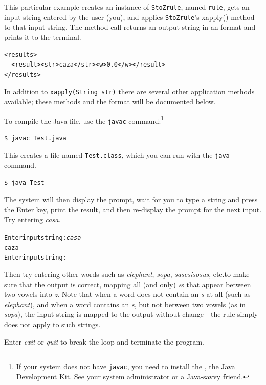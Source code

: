 \noindent
This particular example creates an instance of \texttt{StoZrule}, named \texttt{rule}, gets an input
string entered by the user (you), and applies \texttt{StoZrule}'s xapply() method to that input string.  The method call returns an output string in an \xml{}
format and prints it to the terminal.   

\begin{Verbatim}
<results>
  <result><str>caza</str><w>0.0</w></result>
</results>
\end{Verbatim}

In addition to \texttt{xapply(String str)} there are several other
application methods available; these methods and the \xml{} format
will be documented below.

To compile the Java file, use the \texttt{javac} command:\footnote{If your system does not have
\texttt{javac}, you need to install the , the Java Development Kit.  See your system
administrator or a Java-savvy friend.}

\begin{Verbatim}
$ javac Test.java
\end{Verbatim}

\noindent
This creates a file named \texttt{Test.class}, which you can run with the \texttt{java} command.

\begin{Verbatim}
$ java Test
\end{Verbatim}

\noindent
The system will then display the prompt, wait for you to type a string and press the Enter key,
print the result, and then re-display the prompt for the next input.  Try entering \emph{casa}.

\begin{alltt}
Enter input string: \emph{casa}
caza
Enter input string:
\end{alltt}

\noindent
Then try entering other words such as \emph{elephant}, \emph{sopa}, \emph{sasesisosus}, etc.\@ to
make sure that the output is correct, mapping all (and only) \emph{s}s that appear between two
vowels into \emph{z}.  Note that when a word does not contain an \emph{s} at all (such as
\emph{elephant}), and when a word contains an \emph{s}, but not between two vowels (as in
\emph{sopa}), the input string is mapped to the output without change---the rule simply does not
apply to such strings.

Enter \emph{exit} or \emph{quit} to break the loop and terminate the program.

